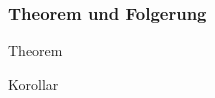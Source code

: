\documentclass[%
	,ngerman
	,hyperref={%
		,bookmarks
		,colorlinks=true
		,citecolor=blue
		,linkcolor=blue
		,urlcolor=blue
			}
	,smaller
	]{beamer}
\begin{document}
\begin{frame}
	\frametitle{Theorem und Folgerung}
	
	\begin{theorem}
		Theorem
	\end{theorem}
	
	\begin{corollary}
		Korollar
	\end{corollary}
\end{frame}
\end{document}
